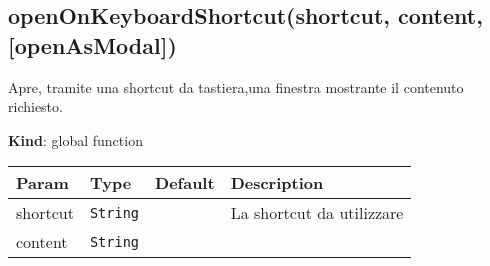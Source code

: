 \hypertarget{openonkeyboardshortcutshortcut-content-openasmodal}{%
\subsection{openOnKeyboardShortcut(shortcut, content,
{[}openAsModal{]})}\label{openonkeyboardshortcutshortcut-content-openasmodal}}

Apre, tramite una shortcut da tastiera,una finestra mostrante il
contenuto richiesto.

\textbf{Kind}: global function

\begin{tabularx}{\textwidth}{XXXX}
\toprule
\begin{minipage}[b]{0.22\columnwidth}\raggedright
Param\strut
\end{minipage} & \begin{minipage}[b]{0.22\columnwidth}\raggedright
Type\strut
\end{minipage} & \begin{minipage}[b]{0.22\columnwidth}\raggedright
Default\strut
\end{minipage} & \begin{minipage}[b]{0.22\columnwidth}\raggedright
Description\strut
\end{minipage}\tabularnewline
\midrule
\endhead
\begin{minipage}[t]{0.22\columnwidth}\raggedright
shortcut\strut
\end{minipage} & \begin{minipage}[t]{0.22\columnwidth}\raggedright
\texttt{String}\strut
\end{minipage} & \begin{minipage}[t]{0.22\columnwidth}\raggedright
\strut
\end{minipage} & \begin{minipage}[t]{0.22\columnwidth}\raggedright
La shortcut da utilizzare\strut
\end{minipage}\tabularnewline
\begin{minipage}[t]{0.22\columnwidth}\raggedright
content\strut
\end{minipage} & \begin{minipage}[t]{0.22\columnwidth}\raggedright
\texttt{String}\strut
\end{minipage} & \begin{minipage}[t]{0.22\columnwidth}\raggedright
\strut
\end{minipage} & \begin{minipage}[t]{0.22\columnwidth}\raggedright

\end{minipage}
\end{tabularx}
